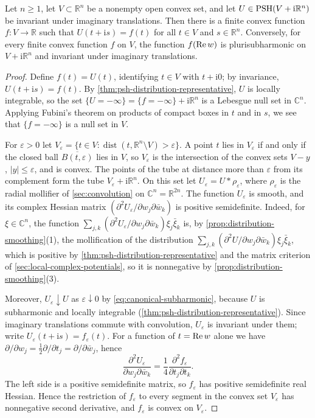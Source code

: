 \begin{proposition}\label{prop:invariant-psh-convexity}
Let $n\geq1$, let $V\subset\mathbb R^n$ be a nonempty open convex set, and let $U\in\mathrm{PSH}(V+\mathrm i\mathbb R^n)$ be invariant under imaginary translations. Then there is a finite convex function $f\colon V\to\mathbb R$ such that $U(t+\mathrm is)=f(t)$ for all $t\in V$ and $s\in\mathbb R^n$. Conversely, for every finite convex function $f$ on $V$, the function $f(\operatorname{Re} w)$ is plurisubharmonic on $V+\mathrm i\mathbb R^n$ and invariant under imaginary translations.
\end{proposition}
\begin{proof}
Define $f(t)=U(t)$, identifying $t\in V$ with $t+\mathrm i0$; by invariance, $U(t+\mathrm is)=f(t)$. By \cref{thm:psh-distribution-representative}, $U$ is locally integrable, so the set $\{U=-\infty\}=\{f=-\infty\}+\mathrm i\mathbb R^n$ is a Lebesgue null set in $\mathbb C^n$. Applying Fubini's theorem on products of compact boxes in $t$ and in $s$, we see that $\{f=-\infty\}$ is a null set in $V$.

For $\varepsilon>0$ let $V_\varepsilon=\{t\in V:\operatorname{dist}(t,\mathbb R^n\setminus V)>\varepsilon\}$. A point $t$ lies in $V_\varepsilon$ if and only if the closed ball $\overline{B(t,\varepsilon)}$ lies in $V$, so $V_\varepsilon$ is the intersection of the convex sets $V-y$, $|y|\leq\varepsilon$, and is convex. The points of the tube at distance more than $\varepsilon$ from its complement form the tube $V_\varepsilon+\mathrm i\mathbb R^n$. On this set let $U_\varepsilon=U*\rho_\varepsilon$, where $\rho_\varepsilon$ is the radial mollifier of \cref{sec:convolution} on $\mathbb C^n=\mathbb R^{2n}$. The function $U_\varepsilon$ is smooth, and its complex Hessian matrix $(\partial^2U_\varepsilon/\partial w_j\partial\bar w_k)$ is positive semidefinite. Indeed, for $\xi\in\mathbb C^n$, the function $\sum_{j,k}(\partial^2U_\varepsilon/\partial w_j\partial\bar w_k)\xi_j\bar\xi_k$ is, by \cref{prop:distribution-smoothing}(1), the mollification of the distribution $\sum_{j,k}(\partial^2U/\partial w_j\partial\bar w_k)\xi_j\bar\xi_k$, which is positive by \cref{thm:psh-distribution-representative} and the matrix criterion of \cref{sec:local-complex-potentials}, so it is nonnegative by \cref{prop:distribution-smoothing}(3).

Moreover, $U_\varepsilon\downarrow U$ as $\varepsilon\downarrow0$ by \eqref{eq:canonical-subharmonic}, because $U$ is subharmonic and locally integrable (\cref{thm:psh-distribution-representative}). Since imaginary translations commute with convolution, $U_\varepsilon$ is invariant under them; write $U_\varepsilon(t+\mathrm is)=f_\varepsilon(t)$. For a function of $t=\operatorname{Re} w$ alone we have $\partial/\partial w_j=\frac12\partial/\partial t_j=\partial/\partial\bar w_j$, hence
\[
 \frac{\partial^2U_\varepsilon}{\partial w_j\partial\bar w_k}
             =\frac14\frac{\partial^2f_\varepsilon}{\partial t_j\partial t_k}.
\]
The left side is a positive semidefinite matrix, so $f_\varepsilon$ has positive semidefinite real Hessian. Hence the restriction of $f_\varepsilon$ to every segment in the convex set $V_\varepsilon$ has nonnegative second derivative, and $f_\varepsilon$ is convex on $V_\varepsilon$.


\end{proof}
